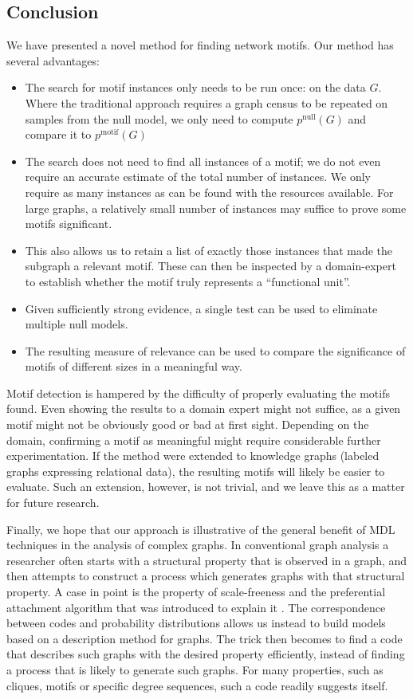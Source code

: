 \documentclass[twoside,11pt]{article}
\begin{document}
\subsection{Conclusion} 

\label{section:conclusion}

We have presented a novel method for finding network motifs. Our method has several advantages:
\begin{itemize}
  \item The search for motif instances only needs to be run once: on the data $G$. Where the traditional approach requires a graph census to be repeated on samples from the null model, we only need to compute $p^\text{null}(G)$ and compare it to $p^\text{motif}(G)$ 
  \item The search does not need to find all instances of a motif; we do not even require an accurate estimate of the total number of instances. We only require as many instances as can be found with the resources available. For large graphs, a relatively small number of instances may suffice to prove some motifs significant.
  \item This also allows us to retain a list of exactly those instances that made the subgraph a relevant motif. These can then be inspected by a domain-expert to establish whether the motif truly represents a ``functional unit''. 
  \item Given sufficiently strong evidence, a single test can be used to eliminate multiple null models. 
  \item The resulting measure of relevance can be  used to compare the significance of motifs of different sizes in a meaningful way.
\end{itemize}

\noindent Motif detection is hampered by the difficulty of properly evaluating the motifs found. Even showing the results to a domain expert might not suffice, as a given motif might not be obviously good or bad at first sight. Depending on the domain, confirming a motif as meaningful might require considerable further experimentation. If the method were extended to knowledge graphs (labeled graphs expressing relational data), the resulting motifs will likely be easier to evaluate. Such an extension, however, is not trivial, and we leave this as a matter for future research.

Finally, we hope that our approach is illustrative of the general benefit of MDL techniques in the analysis of complex graphs. In conventional graph analysis a researcher often starts with a structural property that is observed in a graph, and then attempts to construct a process which generates graphs with that structural property. A case in point is the property of scale-freeness and the preferential attachment algorithm that was introduced to explain it \citep{albert2002statistical}. The correspondence between codes and probability distributions allows us instead to build models based on a description method for graphs. The trick then becomes to find a code that describes such graphs  with the desired property efficiently, instead of finding a process that is likely to generate such graphs. For many properties, such as cliques, motifs or specific degree sequences, such a code readily suggests itself. 
\end{document}
